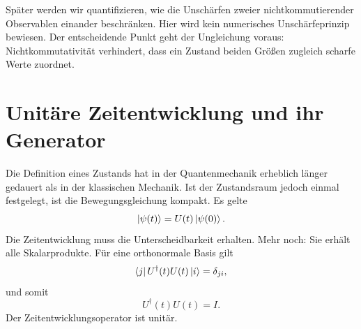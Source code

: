 Später werden wir quantifizieren, wie die Unschärfen zweier nichtkommutierender Observablen einander beschränken. Hier wird kein numerisches Unschärfeprinzip bewiesen. Der entscheidende Punkt geht der Ungleichung voraus: Nichtkommutativität verhindert, dass ein Zustand beiden Größen zugleich scharfe Werte zuordnet.

\begin{classroomqa}\end{classroomqa}

\begin{classroomqa}\end{classroomqa}

\section{Unitäre Zeitentwicklung und ihr Generator}

Die Definition eines Zustands hat in der Quantenmechanik erheblich länger gedauert als in der klassischen Mechanik. Ist der Zustandsraum jedoch einmal festgelegt, ist die Bewegungsgleichung kompakt. Es gelte
\begin{equation}
\left\lvert\psi(t)\right\rangle=U(t)\left\lvert\psi(0)\right\rangle.
\label{eq:l5-propagator}
\end{equation}
Die Zeitentwicklung muss die Unterscheidbarkeit erhalten. Mehr noch: Sie erhält alle Skalarprodukte. Für eine orthonormale Basis gilt
\begin{equation}
\left\langle j\right\rvert U^\dagger(t)U(t)\left\lvert i\right\rangle=\delta_{ji},
\end{equation}
und somit
\begin{equation}
U^\dagger(t)U(t)=I.
\label{eq:l5-unitarity}
\end{equation}
Der Zeitentwicklungsoperator ist unitär.

